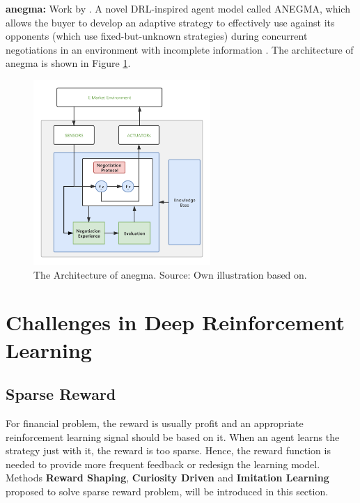 \textbf{\gls{anegma}:} Work by \parencite{bagga2020deep}. A novel DRL-inspired agent model called ANEGMA, which allows the buyer to develop an adaptive strategy to effectively use against its opponents (which use fixed-but-unknown strategies) during concurrent negotiations in an environment with incomplete information . The architecture of \gls{anegma} is shown in Figure \ref{fig:anegma}.
\begin{figure}[htbp]
\centering
\includegraphics[width=0.6\textwidth]{./images/anegma.png}
\caption{The Architecture of \gls{anegma}. Source: Own illustration based on\parencite{bagga2020deep}.}
\label{fig:anegma}
\end{figure}


\section{Challenges in Deep Reinforcement Learning}

\subsection{Sparse Reward} \label{related-work:sparse-reward}
For financial problem, the reward is usually profit and an appropriate reinforcement learning signal should be based on it. When an agent learns the strategy just with it, the reward is too sparse. Hence, the reward function is needed to provide more frequent feedback or redesign the learning model. Methods \textbf{Reward Shaping},\textbf{ Curiosity Driven} and \textbf{Imitation Learning} proposed to solve sparse reward problem, will be introduced in this section.

